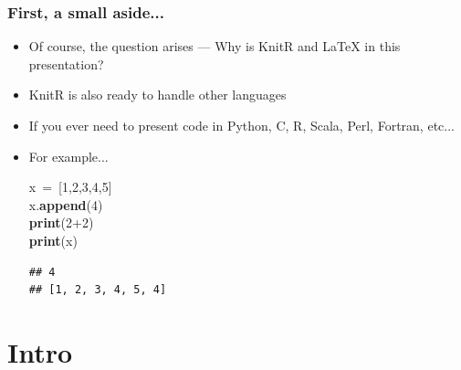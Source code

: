 \documentclass{beamer}\usepackage[]{graphicx}\usepackage[]{color}
\makeatletter
\newcommand{\hlnum}[1]{\textcolor[rgb]{0.686,0.059,0.569}{#1}}%
\newcommand{\hlopt}[1]{\textcolor[rgb]{0,0,0}{#1}}%
\newcommand{\hlstd}[1]{\textcolor[rgb]{0.345,0.345,0.345}{#1}}%
\newcommand{\hlkwa}[1]{\textcolor[rgb]{0.161,0.373,0.58}{\textbf{#1}}}%
\newcommand{\hlkwd}[1]{\textcolor[rgb]{0.737,0.353,0.396}{\textbf{#1}}}%
\newenvironment{kframe}{%
 \def\at@end@of@kframe{}%
 \ifinner\ifhmode%
  \def\at@end@of@kframe{\end{minipage}}%
  \begin{minipage}{\columnwidth}%
 \fi\fi%
 \def\FrameCommand##1{\hskip\@totalleftmargin \hskip-\fboxsep
 \colorbox{shadecolor}{##1}\hskip-\fboxsep
     \hskip-\linewidth \hskip-\@totalleftmargin \hskip\columnwidth}%
 \MakeFramed {\advance\hsize-\width
   \@totalleftmargin\z@ \linewidth\hsize
   \@setminipage}}%
 {\par\unskip\endMakeFramed%
 \at@end@of@kframe}
\newenvironment{knitrout}{}{} %
\makeatother
\begin{document}
\begin{frame}[fragile]
\frametitle{First, a small aside...}

\begin{itemize}
	\item Of course, the question arises --- Why is KnitR and \LaTeX{} in this presentation?

	\item KnitR is also ready to handle other languages

	\item If you ever need to present code in Python, C, R, Scala, Perl, Fortran, etc...

	\item For example...

\begin{knitrout}
\color{fgcolor}\begin{kframe}
\noindent
\ttfamily
\hlstd{x\ }\hlopt{=\ {[}}\hlstd{}\hlnum{1}\hlstd{}\hlopt{,}\hlstd{}\hlnum{2}\hlstd{}\hlopt{,}\hlstd{}\hlnum{3}\hlstd{}\hlopt{,}\hlstd{}\hlnum{4}\hlstd{}\hlopt{,}\hlstd{}\hlnum{5}\hlstd{}\hlopt{{]}}\hspace*{\fill}\\
\hlstd{x}\hlopt{.}\hlstd{}\hlkwd{append}\hlstd{}\hlopt{(}\hlstd{}\hlnum{4}\hlstd{}\hlopt{)}\hspace*{\fill}\\
\hlstd{}\hlkwa{print}\hlstd{}\hlopt{(}\hlstd{}\hlnum{2}\hlstd{}\hlopt{+}\hlstd{}\hlnum{2}\hlstd{}\hlopt{)}\hspace*{\fill}\\
\hlstd{}\hlkwa{print}\hlstd{}\hlopt{(}\hlstd{x}\hlopt{)}\hlstd{}\hspace*{\fill}
\mbox{}
\normalfont

\begin{verbatim}
## 4
## [1, 2, 3, 4, 5, 4]
\end{verbatim}
\end{kframe}
\end{knitrout}
\end{itemize}
\end{frame}

\section{Intro}
\end{document}
